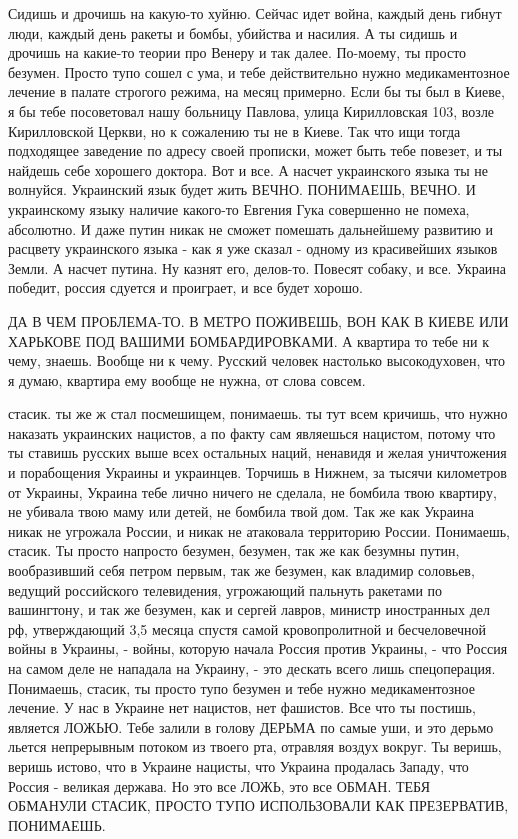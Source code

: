 Сидишь и дрочишь на какую-то хуйню. Сейчас идет война, каждый день гибнут люди,
каждый день ракеты и бомбы, убийства и насилия. А ты сидишь и дрочишь на
какие-то теории про Венеру и так далее. По-моему, ты просто безумен.  Просто
тупо сошел с ума, и тебе действительно нужно медикаментозное лечение в палате
строгого режима, на месяц примерно. Если бы ты был в Киеве, я бы тебе
посоветовал нашу больницу Павлова, улица Кирилловская 103, возле Кирилловской
Церкви, но к сожалению ты не в Киеве. Так что ищи тогда подходящее заведение по
адресу своей прописки, может быть тебе повезет, и ты найдешь себе хорошего
доктора. Вот и все. А насчет украинского языка ты не волнуйся. Украинский язык
будет жить ВЕЧНО. ПОНИМАЕШЬ, ВЕЧНО. И украинскому языку наличие какого-то
Евгения Гука совершенно не помеха, абсолютно. И даже путин никак не сможет
помешать дальнейшему развитию и расцвету украинского языка - как я уже сказал -
одному из красивейших языков Земли. А насчет путина. Ну казнят его, делов-то.
Повесят собаку, и все. Украина победит, россия сдуется и проиграет, и все будет
хорошо. 

ДА В ЧЕМ ПРОБЛЕМА-ТО. В МЕТРО ПОЖИВЕШЬ, ВОН КАК В КИЕВЕ ИЛИ ХАРЬКОВЕ ПОД ВАШИМИ
БОМБАРДИРОВКАМИ. А квартира то тебе ни к чему, знаешь. Вообще ни к чему.
Русский человек настолько высокодуховен, что я думаю, квартира ему вообще не
нужна, от слова совсем.

стасик. ты же ж стал посмешищем, понимаешь.  ты тут всем кричишь, что нужно
наказать украинских нацистов, а по факту сам являешься нацистом, потому что ты
ставишь русских выше всех остальных наций, ненавидя и желая уничтожения и
порабощения Украины и украинцев. Торчишь в Нижнем, за тысячи километров от
Украины, Украина тебе лично ничего не сделала, не бомбила твою квартиру, не
убивала твою маму или детей, не бомбила твой дом. Так же как Украина никак не
угрожала России, и никак не атаковала территорию России. Понимаешь, стасик. Ты
просто напросто безумен, безумен, так же как безумны путин, вообразивший себя
петром первым, так же безумен, как владимир соловьев, ведущий российского
телевидения, угрожающий пальнуть ракетами по вашингтону, и так же безумен, как
и сергей лавров, министр иностранных дел рф, утверждающий 3,5 месяца спустя
самой кровопролитной и бесчеловечной войны в Украины, - войны, которую начала
Россия против Украины, - что Россия на самом деле не нападала на Украину, - это
дескать всего лишь спецоперация.  Понимаешь, стасик, ты просто тупо безумен и
тебе нужно медикаментозное лечение.  У нас в Украине нет нацистов, нет
фашистов. Все что ты постишь, является ЛОЖЬЮ.  Тебе залили в голову ДЕРЬМА по
самые уши, и это дерьмо льется непрерывным потоком из твоего рта, отравляя
воздух вокруг. Ты веришь, веришь истово, что в Украине нацисты, что Украина
продалась Западу, что Россия - великая держава. Но это все ЛОЖЬ, это все ОБМАН.
ТЕБЯ ОБМАНУЛИ СТАСИК, ПРОСТО ТУПО ИСПОЛЬЗОВАЛИ КАК ПРЕЗЕРВАТИВ, ПОНИМАЕШЬ.


